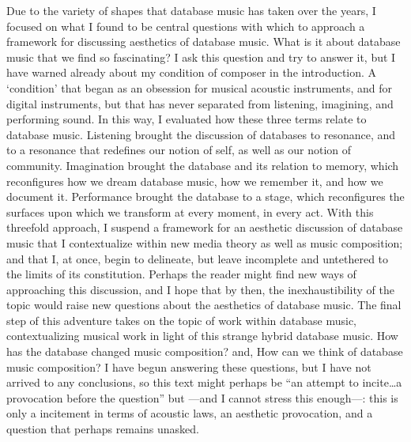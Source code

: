 Due to the variety of shapes that database music has taken over the years, I focused on what I found to be central questions with which to approach a framework for discussing aesthetics of database music. What is it about database music that we find so fascinating? I ask this question and try to answer it, but I have warned already about my condition of composer in the introduction. A `condition' that began as an obsession for musical acoustic instruments, and for digital instruments, but that has never separated from listening, imagining, and performing sound. In this way, I evaluated how these three terms relate to database music. Listening brought the discussion of databases to resonance, and to a resonance that redefines our notion of self, as well as our notion of community. Imagination brought the database and its relation to memory, which reconfigures how we dream database music, how we remember it, and how we document it. Performance brought the database to a stage, which reconfigures the surfaces upon which we transform at every moment, in every act. With this threefold approach, I suspend a framework for an aesthetic discussion of database music that I contextualize within new media theory as well as music composition; and that I, at once, begin to delineate, but leave incomplete and untethered to the limits of its constitution. Perhaps the reader might find new ways of approaching this discussion, and I hope that by then, the inexhaustibility of the topic would raise new questions about the aesthetics of database music. The final step of this adventure takes on the topic of work within database music, contextualizing musical work in light of this strange hybrid database music. How has the database changed music composition? and, How can we think of database music composition? I have begun answering these questions, but I have not arrived to any conclusions, so this text might perhaps be ``an attempt to incite\dots a provocation before the question'' but ---and I cannot stress this enough---: this is only a incitement in terms of acoustic laws, an aesthetic provocation, and a question that perhaps remains unasked.
